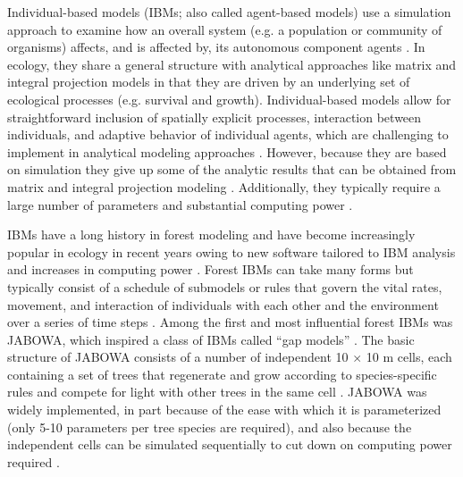 \documentclass[
11pt, %
a4paper, %
oneside, %
headinclude,footinclude, %
]{scrartcl}
\begin{document}
Individual-based models (IBMs; also called agent-based models) use a simulation approach to examine how an overall system (e.g. a population or community of organisms) affects, and is affected by, its autonomous component agents \citep{Grimm2005}. In ecology, they share a general structure with analytical approaches like matrix and integral projection models in that they are driven by an underlying set of ecological processes (e.g. survival and growth). Individual-based models allow for straightforward inclusion of spatially explicit processes, interaction between individuals, and adaptive behavior of individual agents, which are challenging to implement in analytical modeling approaches \citep{Grimm2005}. However, because they are based on simulation they give up some of the analytic results that can be obtained from matrix and integral projection modeling \citep{Jongejans2011}. Additionally, they typically require a large number of parameters and substantial computing power \citep{Grimm2005}.

IBMs have a long history in forest modeling and have become increasingly popular in ecology in recent years owing to new software tailored to IBM analysis and increases in computing power \citep{Grimm2005}. Forest IBMs can take many forms but typically consist of a schedule of submodels or rules that govern the vital rates, movement, and interaction of individuals with each other and the environment over a series of time steps \citep{Bugmann2001, Grimm2005}. Among the first and most influential forest IBMs was JABOWA, which inspired a class of IBMs called “gap models” \citep{Botkin1993}. The basic structure of JABOWA consists of a number of independent 10 $\times$ 10 m cells, each containing a set of trees that regenerate and grow according to species-specific rules and compete for light with other trees in the same cell \citep{Botkin1993}. JABOWA was widely implemented, in part because of the ease with which it is parameterized (only 5-10 parameters per tree species are required), and also because the independent cells can be simulated sequentially to cut down on computing power required \citep{Bugmann2001}.
\end{document}
